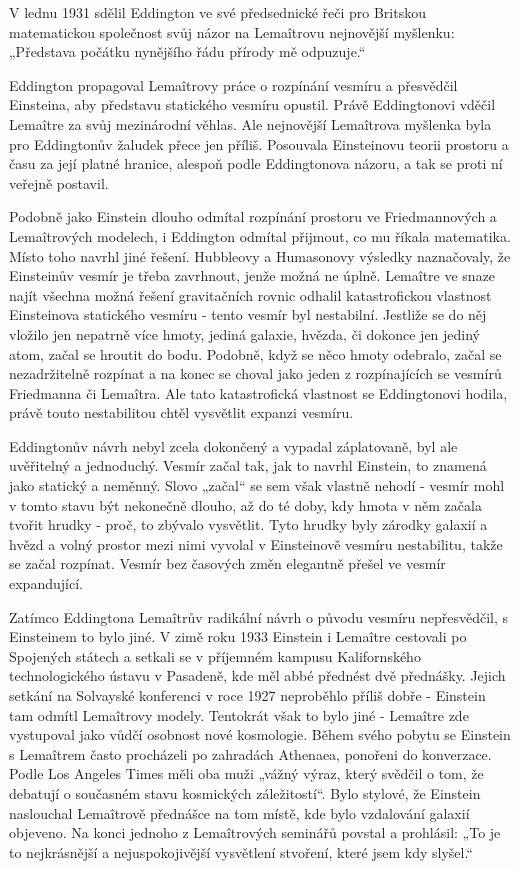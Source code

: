   V lednu 1931 sdělil Eddington ve své předsednické řeči pro Britskou matematickou společnost svůj
  názor na Lemaîtrovu nejnovější myšlenku: „Představa počátku nynějšího řádu přírody mě odpuzuje.“
  
  Eddington propagoval Lemaîtrovy práce o rozpínání vesmíru a přesvědčil Einsteina, aby představu
  statického vesmíru opustil. Právě Eddingtonovi vděčil Lemaître za svůj mezinárodní věhlas. Ale
  nejnovější Lemaîtrova myšlenka byla pro Eddingtonův žaludek přece jen příliš. Posouvala
  Einsteinovu teorii prostoru a času za její platné hranice, alespoň podle Eddingtonova názoru, a
  tak se proti ní veřejně postavil. 
  
  Podobně jako Einstein dlouho odmítal rozpínání prostoru ve Friedmannových a Lemaîtrových modelech,
  i Eddington odmítal přijmout, co mu říkala matematika. Místo toho navrhl jiné řešení. Hubbleovy a
  Humasonovy výsledky naznačovaly, že Einsteinův vesmír je třeba zavrhnout, jenže možná ne úplně.
  Lemaître ve snaze najít všechna možná řešení gravitačních rovnic odhalil katastrofickou vlastnost
  Einsteinova statického vesmíru - tento vesmír byl nestabilní. Jestliže se do něj vložilo jen
  nepatrně více hmoty, jediná galaxie, hvězda, či dokonce jen jediný atom, začal se hroutit do bodu.
  Podobně, když se něco hmoty odebralo, začal se nezadržitelně rozpínat a na konec se choval jako
  jeden z rozpínajících se vesmírů Friedmanna či Lemaîtra. Ale tato katastrofická vlastnost se
  Eddingtonovi hodila, právě touto nestabilitou chtěl vysvětlit expanzi vesmíru. 
  
  Eddingtonův návrh nebyl zcela dokončený a vypadal záplatovaně, byl ale uvěřitelný a jednoduchý.
  Vesmír začal tak, jak to navrhl Einstein, to znamená jako statický a neměnný. Slovo „začal“ se sem
  však vlastně nehodí - vesmír mohl v tomto stavu být nekonečně dlouho, až do té doby, kdy hmota v
  něm začala tvořit hrudky - proč, to zbývalo vysvětlit. Tyto hrudky byly zárodky galaxií a hvězd a
  volný prostor mezi nimi vyvolal v Einsteinově vesmíru nestabilitu, takže se začal rozpínat. Vesmír
  bez časových změn elegantně přešel ve vesmír expandující. 
  
  Zatímco Eddingtona Lemaîtrův radikální návrh o původu vesmíru nepřesvědčil, s Einsteinem to bylo
  jiné. V zimě roku 1933 Einstein i Lemaître cestovali po Spojených státech a setkali se v příjemném
  kampusu Kalifornského technologického ústavu v Pasadeně, kde měl abbé přednést dvě přednášky.
  Jejich setkání na Solvayské konferenci v roce 1927 neproběhlo příliš dobře - Einstein tam odmítl
  Lemaîtrovy modely. Tentokrát však to bylo jiné - Lemaître zde vystupoval jako vůdčí osobnost nové
  kosmologie. Během svého pobytu se Einstein s Lemaîtrem často procházeli po zahradách Athenaea,
  ponořeni do konverzace. Podle Los Angeles Times měli oba muži „vážný výraz, který svědčil o tom,
  že debatují o současném stavu kosmických záležitostí“. Bylo stylové, že Einstein naslouchal
  Lemaîtrově přednášce na tom místě, kde bylo vzdalování galaxií objeveno. Na konci jednoho z
  Lemaîtrových seminářů povstal a prohlásil: „To je to nejkrásnější a nejuspokojivější vysvětlení
  stvoření, které jsem kdy slyšel.“
  
